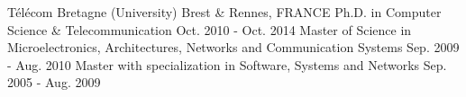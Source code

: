 \begin{cventries}
  \cventryedu
    {T\'{e}l\'{e}com Bretagne (University)}
    {Brest \& Rennes, FRANCE}
    {Ph.D. in Computer Science \& Telecommunication}
    {Oct. 2010 - Oct. 2014}
    {Master of Science in Microelectronics, Architectures, Networks and Communication Systems}
    {Sep. 2009 - Aug. 2010}
    {Master with specialization in Software, Systems and Networks}
    {Sep. 2005 - Aug. 2009}
\end{cventries}
